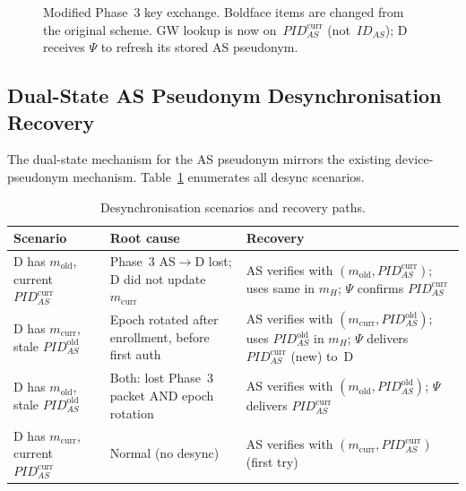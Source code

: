 \documentclass[12pt,a4paper]{article}
\newcommand{\IDas}{\mathit{ID}_{AS}}
\newcommand{\PIDascurr}{\mathit{PID}_{AS}^{\mathrm{curr}}}
\newcommand{\PIDASOld}{\mathit{PID}_{AS}^{\mathrm{old}}}
\newcommand{\mcurr}{m_{\mathrm{curr}}}
\newcommand{\mold}{m_{\mathrm{old}}}
\newcommand{\mnew}{m_{\mathrm{new}}}
\begin{document}
\begin{figure}[H]
\caption{Modified Phase~3 key exchange.  Boldface items are changed
from the original scheme.  GW lookup is now on~$\PIDascurr$ (not~$\IDas$);
D receives $\Psi$ to refresh its stored AS pseudonym.}
\label{fig:keyex-modified}
\end{figure}

\subsection{Dual-State AS Pseudonym Desynchronisation Recovery}
\label{sec:desync}

The dual-state mechanism for the AS pseudonym mirrors the existing
device-pseudonym mechanism.
Table~\ref{tab:desync-cases} enumerates all desync scenarios.

\begin{table}[H]
\caption{Desynchronisation scenarios and recovery paths.}
\label{tab:desync-cases}
\centering
\renewcommand{\arraystretch}{1.35}
\begin{tabularx}{\textwidth}{@{}p{4cm}p{4.5cm}X@{}}
\toprule
\textbf{Scenario} & \textbf{Root cause} & \textbf{Recovery} \\
\midrule
D has $m_{\mathrm{old}}$, current $\PIDascurr$
  & Phase~3 AS$\to$D lost; D did not update $\mcurr$
  & AS verifies with $(\mold, \PIDascurr)$; uses same in $m_H$;
    $\Psi$ confirms $\PIDascurr$ \\
\midrule
D has $\mcurr$, stale $\PIDASOld$
  & Epoch rotated after enrollment, before first auth
  & AS verifies with $(\mcurr, \PIDASOld)$; uses $\PIDASOld$ in $m_H$;
    $\Psi$ delivers $\PIDascurr$ (new) to~D \\
\midrule
D has $\mold$, stale $\PIDASOld$
  & Both: lost Phase~3 packet AND epoch rotation
  & AS verifies with $(\mold, \PIDASOld)$; $\Psi$ delivers $\PIDascurr$ \\
\midrule
D has $\mcurr$, current $\PIDascurr$
  & Normal (no desync)
  & AS verifies with $(\mcurr, \PIDascurr)$ (first try) \\
\bottomrule
\end{tabularx}
\end{table}
\end{document}
